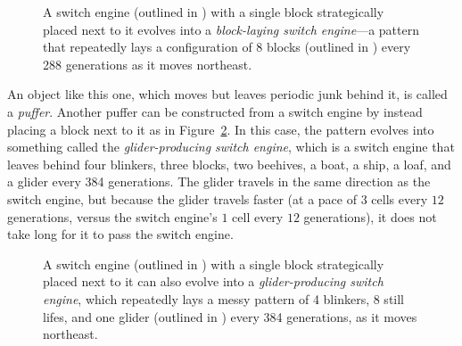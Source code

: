 \begin{figure}[!htb]
	\centering{}
	\caption{A switch engine (outlined in ) with a single block strategically placed next to it evolves into a \emph{block-laying switch engine}---a pattern that repeatedly lays a configuration of 8 blocks (outlined in ) every 288 generations as it moves northeast.}\label{fig:switch_engine_block}
\end{figure}

An object like this one, which moves but leaves periodic junk behind it, is called a \emph{puffer}. Another puffer can be constructed from a switch engine by instead placing a block next to it as in Figure~\ref{fig:switch_engine_glider}. In this case, the pattern evolves into something called the \emph{glider-producing switch engine}, which is a switch engine that leaves behind four blinkers, three blocks, two beehives, a boat, a ship, a loaf, and a glider every 384 generations. The glider travels in the same direction as the switch engine, but because the glider travels faster (at a pace of $3$ cells every $12$ generations, versus the switch engine's $1$ cell every $12$ generations), it does not take long for it to pass the switch engine.

\begin{figure}[!htb]
	\centering{}
	\caption{A switch engine (outlined in ) with a single block strategically placed next to it can also evolve into a \emph{glider-producing switch engine}, which repeatedly lays a messy pattern of 4 blinkers, 8 still lifes, and one glider (outlined in ) every 384 generations, as it moves northeast.}\label{fig:switch_engine_glider}
\end{figure}

